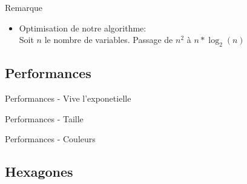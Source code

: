\documentclass[aspectratio=43,11pt,hyperref={pdfpagemode=FullScreen}]{beamer}
\begin{document}
\begin{frame}{Remarque}
\begin{itemize}
    \item Optimisation de notre algorithme: ~\\ \vspace{0,5 cm}
    Soit $n$ le nombre de variables. Passage de $n^{2}$ à $n*\log_2(n)$
    ~\\ \vspace{0,5 cm}
\end{itemize}
\end{frame}

\subsection{Performances}
\begin{frame}{Performances - Vive l'exponetielle}
\begin{center}

\end{center}{}
\end{frame}

\begin{frame}{Performances - Taille}
\begin{center}

\end{center}{}
\end{frame}

\begin{frame}{Performances - Couleurs}
\begin{center}

\end{center}{}
\end{frame}

\subsection{Hexagones}
\end{document}

